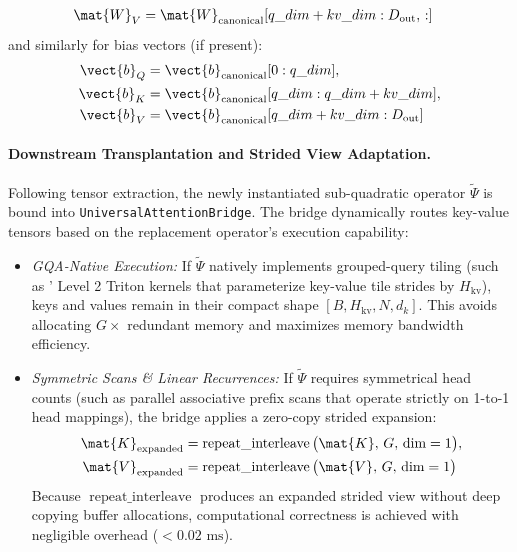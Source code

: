 \begin{enumerate}
\begin{align}
        \mat{W}_V &= \mat{W}_{\text{canonical}}[q\_dim + kv\_dim : D_{\text{out}}, \, :]
        \label{eq:qkv_slicing}
    \end{align}
    and similarly for bias vectors (if present):
    \begin{align}
        \vect{b}_Q &= \vect{b}_{\text{canonical}}[0 : q\_dim], \nonumber \\
        \vect{b}_K &= \vect{b}_{\text{canonical}}[q\_dim : q\_dim + kv\_dim], \nonumber \\
        \vect{b}_V &= \vect{b}_{\text{canonical}}[q\_dim + kv\_dim : D_{\text{out}}]
        \label{eq:bias_slicing_gqa}
    \end{align}
\end{enumerate}

\paragraph{Downstream Transplantation and Strided View Adaptation.} Following tensor extraction, the newly instantiated sub-quadratic operator $\widetilde{\Psi}$ is bound into \texttt{UniversalAttentionBridge}. The bridge dynamically routes key-value tensors based on the replacement operator's execution capability:
\begin{itemize}
    \item \textit{GQA-Native Execution:} If $\widetilde{\Psi}$ natively implements grouped-query tiling (such as \neuralops' Level 2 Triton kernels that parameterize key-value tile strides by $H_{\text{kv}}$), keys and values remain in their compact shape $[B, H_{\text{kv}}, N, d_k]$. This avoids allocating $G\times$ redundant memory and maximizes memory bandwidth efficiency.
    \item \textit{Symmetric Scans \& Linear Recurrences:} If $\widetilde{\Psi}$ requires symmetrical head counts (such as parallel associative prefix scans that operate strictly on 1-to-1 head mappings), the bridge applies a zero-copy strided expansion:
    \begin{equation}
    \begin{split}
        \mat{K}_{\text{expanded}} &= \operatorname{repeat\_interleave}\big(\mat{K}, \, G, \, \text{dim}=1\big), \\
        \mat{V}_{\text{expanded}} &= \operatorname{repeat\_interleave}\big(\mat{V}, \, G, \, \text{dim}=1\big)
    \end{split}
    \label{eq:repeat_interleave}
    \end{equation}
    Because $\operatorname{repeat\_interleave}$ produces an expanded strided view without deep copying buffer allocations, computational correctness is achieved with negligible overhead ($<0.02\text{ ms}$).
\end{itemize}

